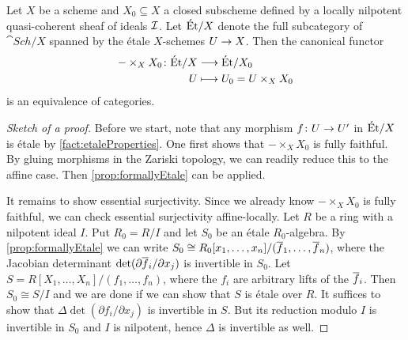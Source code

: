 \documentclass[a4paper, 10pt, oneside, DIV=9, chapterprefix=true, numbers=enddot, bibliography=totoc]{scrbook}
\begin{document}
\begin{prop}\label{prop:thickeningEtaleEquivalence}
	Let $X$ be a scheme and $X_0\subseteq X$ a closed subscheme defined by a locally nilpotent quasi-coherent sheaf of ideals $\mathcal{I}$. Let $\mathrm{\acute{E}t}/X$ denote the full subcategory of $\cat{Sch}/X$ spanned by the étale $X$-schemes $U\morphism X$. Then the canonical functor
	\begin{align*}
		-\times_XX_0\colon \Et/X&\morphism\Et/X_0\\
		U&\longmapsto U_0=U\times_XX_0
	\end{align*}
	is an equivalence of categories.
\end{prop}
\begin{proof}[Sketch of a proof]
	Before we start, note that any morphism $f\colon U\morphism U'$ in $\mathrm{\acute{E}t}/X$ is étale by \cref{fact:etaleProperties}.	One first shows that $-\times_XX_0$ is fully faithful. By gluing morphisms in the Zariski topology, we can readily reduce this to the affine case. Then \cref{prop:formallyEtale} can be applied.
	
	It remains to show essential surjectivity. Since we already know $-\times_XX_0$ is fully faithful, we can check essential surjectivity affine-locally. Let $R$ be a ring with a nilpotent ideal $I$. Put $R_0=R/I$ and let $S_0$ be an étale $R_0$-algebra. By \cref{prop:formallyEtale} we can write $S_0\cong R_0[x_1,\dotsc,x_n]/(\ov{f}_1,\dotsc,\ov{f}_n)$, where the Jacobian determinant $\det(\partial \ov{f}_i/\partial x_j)$ is invertible in $S_0$. Let $S=R[X_1,\dotsc,X_n]/(f_1,\dotsc,f_n)$, where the $f_i$ are arbitrary lifts of the $\ov{f}_i$. Then $S_0\cong S/I$ and we are done if we can show that $S$ is étale over $R$. It suffices to show that $\Delta \det(\partial f_i/\partial x_j)$ is invertible in $S$. But its reduction modulo $I$ is invertible in $S_0$ and $I$ is nilpotent, hence $\Delta$ is invertible as well.
\end{proof}
\end{document}

